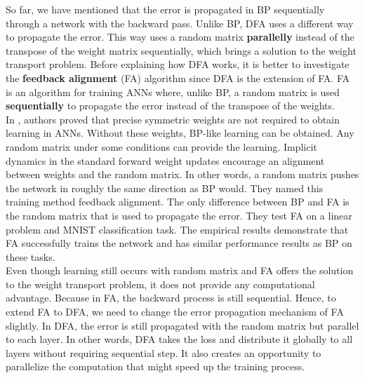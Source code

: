 \documentclass[a4paper, nobind]{templates/ociamthesis}
\begin{document}
So far, we have mentioned that the error is propagated in BP sequentially through a network with the backward pass. Unlike BP, DFA uses a different way to propagate the error. This way uses a random matrix \textbf{parallelly} instead of the transpose of the weight matrix sequentially, which brings a solution to the weight transport problem. Before explaining how DFA works, it is better to investigate the \textbf{feedback alignment} (FA) algorithm since DFA is the extension of FA. FA is an algorithm for training ANNs where, unlike BP, a random matrix is used \textbf{sequentially} to propagate the error instead of the transpose of the weights.\\
In \cite{lillicrap2014random}, authors proved that precise symmetric weights are not required to obtain learning in ANNs. Without these weights, BP-like learning can be obtained. Any random matrix under some conditions can provide the learning. Implicit dynamics in the standard forward weight updates encourage an alignment between weights and the random matrix. In other words, a random matrix pushes the network in roughly the same direction as BP would. They named this training method feedback alignment. The only difference between BP and FA is the random matrix that is used to propagate the error. They test FA on a linear problem and MNIST classification task. The empirical results demonstrate that FA successfully trains the network and has similar performance results as BP on these tasks.\\
Even though learning still occurs with random matrix and FA offers the solution to the weight transport problem, it does not provide any computational advantage. Because in FA, the backward process is still sequential. Hence, to extend FA to DFA, we need to change the error propagation mechanism of FA slightly. In DFA, the error is still propagated with the random matrix but parallel to each layer. In other words, DFA takes the loss and distribute it globally to all layers without requiring sequential step. It also creates an opportunity to parallelize the computation that might speed up the training process.
\end{document}

